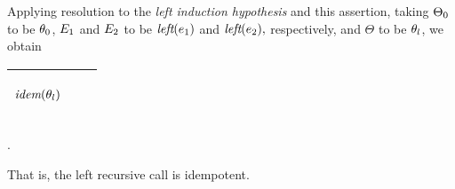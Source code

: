 \documentclass[runningheads]{llncs}
\DeclareMathOperator{\lef}{\emph{left}}
\DeclareMathOperator{\idem}{\emph{idem}}
\begin{document}
Applying resolution to the \emph{left induction hypothesis} and this assertion, taking $\Theta_{0}$ to be $\theta_{0}$, $E_{1}$ and $E_{2}$ to be $\lef(\e{1})$ and $\lef(\e{2}),$ respectively, and $\Theta$ to be $\theta_{l}$, we obtain 
\begin{center}
  \begin{tabular}{|m{}|m{}||m{}|}
\hline
\begin{center}
{$
\begin{aligned}
\idem(\thet{l})
\end{aligned} $}  \hspace{0cm} 
\end{center}& &  \\  \hline
\end{tabular}.
\end{center}
That is, the left recursive call is idempotent. 
\end{document}
